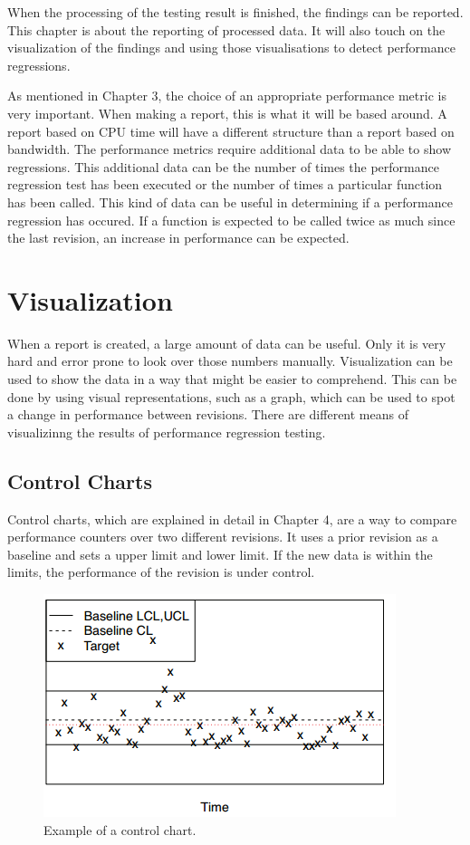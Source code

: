 When the processing of the testing result is finished, the findings can be reported. This chapter is about the reporting of processed data. It will also touch on the visualization of the findings and using those visualisations to detect performance regressions.

As mentioned in Chapter 3, the choice of an appropriate performance metric is very important. When making a report, this is what it will be based around. A report based on CPU time will have a different structure than a report based on bandwidth. The performance metrics require additional data to be able to show regressions. This additional data can be the number of times the performance regression test has been executed or the number of times a particular function has been called. This kind of data can be useful in determining if a performance regression has occured. If a function is expected to be called twice as much since the last revision, an increase in performance can be expected.

\section{Visualization}
When a report is created, a large amount of data can be useful. Only it is very hard and error prone to look over those numbers manually. Visualization can be used to show the data in a way that might be easier to comprehend. This can be done by using visual representations, such as a graph, which can be used to spot a change in performance between revisions. There are different means of visualizinng the results of performance regression testing.

\subsection{Control Charts}
Control charts, which are explained in detail in Chapter 4, are a way to compare performance counters over two different revisions. It uses a prior revision as a baseline and sets a upper limit and lower limit. If the new data is within the limits, the performance of the revision is under control.
\begin{figure}[h]
\begin{center}
  \includegraphics[scale=0.7]{Figures/controlchart.png}
\end{center}
  \caption{Example of a control chart\cite{nguyen2012using}.}
  \label{figure:control_chart}

\end{figure}

